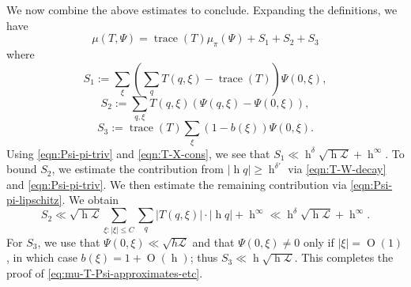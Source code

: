 \documentclass[reqno,10pt]{amsart}
\theoremstyle{plain} %
\theoremstyle{definition}
\theoremstyle{plain} %
\theoremstyle{remark}
\theoremstyle{itplain} %
\theoremstyle{remark} %
\renewcommand{\geq}{\geqslant}
\renewcommand{\leq}{\leqslant}
\numberwithin{equation}{section}
\DeclareMathOperator{\trace}{trace}
\def\O{\operatorname{O}}
\DeclareMathOperator{\h}{h}
\begin{document}
We now combine the above estimates to conclude.  Expanding the definitions, we have
\[
  \mu(T,\Psi) = \trace(T) \mu_{\pi}(\Psi) + S_1 + S_2 + S_3
\]
where
\begin{equation}
  S_1 :=
  \sum_{\xi}
  \left(\sum_q T(q,\xi) - \trace(T)\right) \Psi(0,\xi),
\end{equation}
\begin{equation}
  S_2 :=
  \sum_{q,\xi}
  T(q,\xi) (\Psi(q,\xi) - \Psi(0,\xi)),
\end{equation}
\begin{equation}
  S_3 :=
  \trace(T)
  \sum_{\xi} (1 - b(\xi)) \Psi(0,\xi).
\end{equation}
Using \eqref{eqn:Psi-pi-triv} and \eqref{eqn:T-X-cons}, we see that $S_1 \ll \h^\delta \sqrt{\h \mathcal{L} } + \h^\infty$.  To bound $S_2$, we estimate the contribution from $|\h q| \geq \h^{\delta '}$ via \eqref{eqn:T-W-decay} and \eqref{eqn:Psi-pi-triv}.  We then estimate the remaining contribution via \eqref{eqn:Psi-pi-lipschitz}.  We obtain
\begin{equation}
  S_2 \ll
  \sqrt{\h \mathcal{L} }
  \sum_{\xi : |\xi| \leq C}
  \sum_{q}
  |T(q,\xi)|
  \cdot
  |\h q|
  +
  \h^{\infty}
  \ll
  \h^{\delta} \sqrt{\h \mathcal{L} }
  + \h^\infty.
\end{equation}
For $S_3$, we use that $\Psi(0,\xi) \ll \sqrt{h \mathcal{L}}$ and that $\Psi(0,\xi) \neq 0$ only if $|\xi| = \O(1)$, in which case $b(\xi) = 1 + \O(\h)$; thus $S_3 \ll \h \sqrt{\h \mathcal{L}}$.  This completes the proof of \eqref{eq:mu-T-Psi-approximates-etc}.
\end{document}
